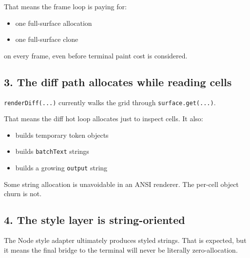 That means the frame loop is paying for:

\begin{itemize}
\tightlist
\item
  one full-surface allocation
\item
  one full-surface clone
\end{itemize}

on every frame, even before terminal paint cost is considered.

\subsection{3. The diff path allocates while reading cells}\label{record-052-the-diff-path-allocates-while-reading-cells}

\texttt{r\allowbreak{}e\allowbreak{}n\allowbreak{}d\allowbreak{}e\allowbreak{}r\allowbreak{}D\allowbreak{}i\allowbreak{}f\allowbreak{}f\allowbreak{}(\allowbreak{}.\allowbreak{}.\allowbreak{}.\allowbreak{})} currently walks the grid through \texttt{s\allowbreak{}u\allowbreak{}r\allowbreak{}f\allowbreak{}a\allowbreak{}c\allowbreak{}e\allowbreak{}.\allowbreak{}g\allowbreak{}e\allowbreak{}t\allowbreak{}(\allowbreak{}.\allowbreak{}.\allowbreak{}.\allowbreak{})}.

That means the diff hot loop allocates just to inspect cells. It also:

\begin{itemize}
\tightlist
\item
  builds temporary token objects
\item
  builds \texttt{b\allowbreak{}a\allowbreak{}t\allowbreak{}c\allowbreak{}h\allowbreak{}T\allowbreak{}e\allowbreak{}x\allowbreak{}t} strings
\item
  builds a growing \texttt{o\allowbreak{}u\allowbreak{}t\allowbreak{}p\allowbreak{}u\allowbreak{}t} string
\end{itemize}

Some string allocation is unavoidable in an ANSI renderer. The per-cell object churn is not.

\subsection{4. The style layer is string-oriented}\label{record-052-the-style-layer-is-string-oriented}

The Node style adapter ultimately produces styled strings. That is expected, but it means the final bridge to the terminal will never be literally zero-allocation.


